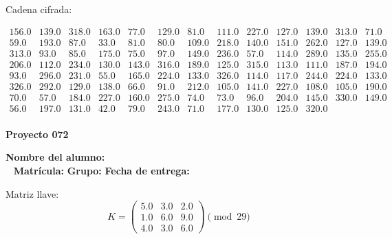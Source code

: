 \documentclass[12pt]{article}
\begin{document}
Cadena cifrada:
\begin{center}
$\begin{array}{lllllllllllll}
156.0 & 139.0 & 318.0 & 163.0 & 77.0 & 129.0 & 81.0 & 111.0 & 227.0 & 127.0 & 139.0 & 313.0 & 71.0\\
59.0 & 193.0 & 87.0 & 33.0 & 81.0 & 80.0 & 109.0 & 218.0 & 140.0 & 151.0 & 262.0 & 127.0 & 139.0\\
313.0 & 93.0 & 85.0 & 175.0 & 75.0 & 97.0 & 149.0 & 236.0 & 57.0 & 114.0 & 289.0 & 135.0 & 255.0\\
206.0 & 112.0 & 234.0 & 130.0 & 143.0 & 316.0 & 189.0 & 125.0 & 315.0 & 113.0 & 111.0 & 187.0 & 194.0\\
93.0 & 296.0 & 231.0 & 55.0 & 165.0 & 224.0 & 133.0 & 326.0 & 114.0 & 117.0 & 244.0 & 224.0 & 133.0\\
326.0 & 292.0 & 129.0 & 138.0 & 66.0 & 91.0 & 212.0 & 105.0 & 141.0 & 227.0 & 108.0 & 105.0 & 190.0\\
70.0 & 57.0 & 184.0 & 227.0 & 160.0 & 275.0 & 74.0 & 73.0 & 96.0 & 204.0 & 145.0 & 330.0 & 149.0\\
56.0 & 197.0 & 131.0 & 42.0 & 79.0 & 243.0 & 71.0 & 177.0 & 130.0 & 125.0 & 320.0\\
\end{array}$
\end{center}

\newpage


\textbf{Proyecto 072}

\textbf{Nombre del alumno:} \underline{\hspace{13cm}}\\\
\vspace{1cm}
\textbf{Matrícula:} \underline{\hspace{4cm}} \hspace{1cm}
\textbf{Grupo:} \underline{\hspace{2cm}}
\textbf{Fecha de entrega:} \underline{\hspace{2cm}}

\medskip

Matriz llave:
\[
K = \begin{pmatrix}
5.0 & 3.0 & 2.0\\
1.0 & 6.0 & 9.0\\
4.0 & 3.0 & 6.0
\end{pmatrix} \pmod{29}
\]
\end{document}
